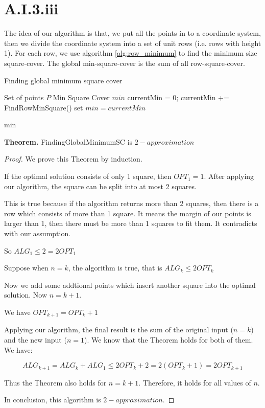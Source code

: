 \section*{A.I.3.iii}
\label{a-1-3-3}

The idea of our algorithm is that, we put all the points in to a coordinate system, then we divide the coordinate system into a set of unit rows (i.e. rows with height 1). For each row, we use algorithm \ref{alg:row_minimum} to find the minimum size square-cover. The global min-square-cover is the sum of all row-square-cover.

\begin{algorithm}
  \caption{Finding global minimum square cover}
  \label{alg:global_minimum}
  \begin{algorithmic}
    \renewcommand{\algorithmicrequire}{\textbf{Input:}}
    \renewcommand{\algorithmicensure}{\textbf{Output:}}
    \algnewcommand{}
    \algnewcommand\Operation{\item[\algorithmicoperation]}
    \Require Set of points $P$
    \Ensure Min Square Cover $min$
    \Operation
    \State currentMin = 0;
    \State currentMin += FindRowMinSquare()
    \EndFor
    \State set $min = currentMin$
    
    \Return min
  \end{algorithmic}
\end{algorithm}

\textbf{Theorem.} FindingGlobalMinimumSC is $2-approximation$

\begin{proof}
  We prove this Theorem by induction.
  
  If the optimal solution consists of only 1 square, then $OPT_1 = 1$. After applying our algorithm, the square can be split into at most 2 squares.

  This is true because if the algorithm returns more than 2 squares, then there is a row which consists of more than 1 square. It means the margin of our points is larger than 1, then there must be more than 1 squares to fit them. It contradicts with our assumption.
  
So $ALG_1 \leq 2 = 2OPT_1$

Suppose when $n = k$, the algorithm is true, that is $ALG_k \leq 2OPT_k$

Now we add some addtional points which insert another square into the optimal solution. Now $n = k + 1$.

We have $OPT_{k+1} = OPT_k + 1$

Applying our algorithm, the final result is the sum of the original input ($n = k$) and the new input ($n = 1$). We know that the Theorem holds for both of them. We have:

\begin{equation}
  ALG_{k + 1} = ALG_k + ALG_1 \leq 2OPT_k + 2 = 2(OPT_k + 1) = 2OPT_{k+1}
\end{equation}

Thus the Theorem also holds for $n = k + 1$. Therefore, it holds for all values of $n$.

  In conclusion, this algorithm is $2-approximation$.

\end{proof}
